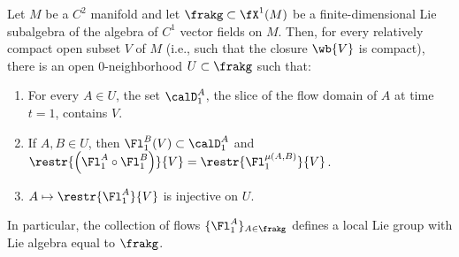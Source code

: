 \begin{thm}[{{\cite[Thm.~1.8.3]{DK}}}]\label{thm 1.8.3 DK}
    Let $M$ be a $C^2$ manifold and let $\frakg\subset \fX^1(M)$ be a finite-dimensional Lie subalgebra of the algebra of $C^1$ vector fields on $M$. Then, for every relatively compact open subset $V$ of $M$ (i.e., such that the closure $\wb{V}$ is compact), there is an open $0$-neighborhood $U\subset\frakg$ such that:
    \begin{enumerate}[label=(\alph*)]
        \item For every $A\in U$, the set $\calD^A_{1}$, the slice of the flow domain of $A$ at time $t=1$, contains $V$.
        \item If $A,B\in U$, then $\Fl^B_1(V)\subset \calD^A_1$ and $\restr{\left(\Fl^A_1\circ \Fl^B_1\right)}{V}=\restr{\Fl^{\mu(A,B)}_1}{V}$.
        \item $A\mapsto \restr{\Fl^A_1}{V}$ is injective on $U$.
    \end{enumerate}
    In particular, the collection of flows $\{\Fl^A_1\}_{A\in\frakg}$ defines a local Lie group with Lie algebra equal to $\frakg$.
\end{thm}
